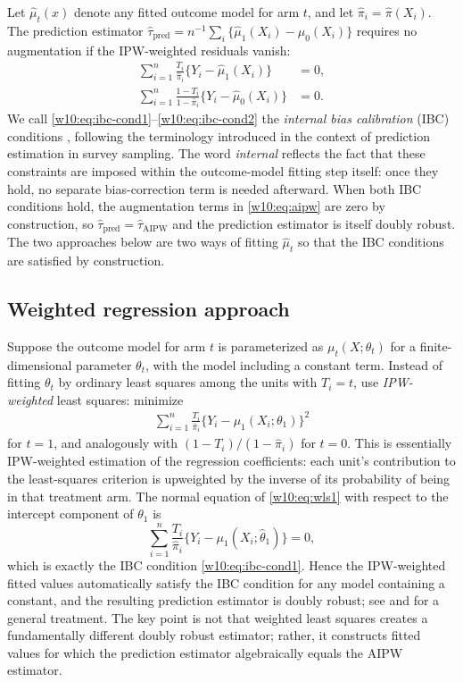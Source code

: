 \documentclass[master.tex]{subfiles}
\begin{document}
Let $\hat\mu_t(x)$ denote any fitted outcome model for arm $t$, and
let $\hat\pi_i = \hat\pi(X_i)$.  The prediction estimator
$\hat\tau_{\mathrm{pred}} = n^{-1}\sum_i\{\hat\mu_1(X_i)-\hat\mu_0(X_i)\}$
requires no augmentation if the IPW-weighted residuals vanish:
\begin{align}
  \sum_{i=1}^n \frac{T_i}{\hat\pi_i}
    \bigl\{Y_i - \hat\mu_1(X_i)\bigr\} &= 0,
  \label{w10:eq:ibc-cond1} \\
  \sum_{i=1}^n \frac{1-T_i}{1-\hat\pi_i}
    \bigl\{Y_i - \hat\mu_0(X_i)\bigr\} &= 0.
  \label{w10:eq:ibc-cond2}
\end{align}
We call \eqref{w10:eq:ibc-cond1}--\eqref{w10:eq:ibc-cond2} the
\emph{internal bias calibration} (IBC) conditions
\citep{firth1998robust}, following the terminology introduced in the
context of prediction estimation in survey sampling.  The word
\emph{internal} reflects the fact that these constraints are imposed
within the outcome-model fitting step itself: once they hold, no
separate bias-correction term is needed afterward.  When both IBC
conditions hold, the augmentation terms in \eqref{w10:eq:aipw} are
zero by construction, so $\hat\tau_{\mathrm{pred}} =
\hat\tau_{\mathrm{AIPW}}$ and the prediction estimator is itself
doubly robust.  The two approaches below are two ways of fitting
$\hat\mu_t$ so that the IBC conditions are satisfied by construction.

\subsection{Weighted regression approach}
\label{w10:subsec:wls}

Suppose the outcome model for arm $t$ is parameterized as
$\mu_t(X;\theta_t)$ for a finite-dimensional parameter $\theta_t$,
with the model including a constant term.  Instead of fitting
$\theta_t$ by ordinary least squares among the units with $T_i=t$,
use \emph{IPW-weighted} least squares: minimize
\begin{align}
  \sum_{i=1}^n \frac{T_i}{\hat\pi_i}
    \bigl\{Y_i - \mu_1(X_i;\theta_1)\bigr\}^2
  \label{w10:eq:wls1}
\end{align}
for $t=1$, and analogously with $(1-T_i)/(1-\hat\pi_i)$ for $t=0$.
This is essentially IPW-weighted estimation of the regression
coefficients: each unit's contribution to the least-squares criterion
is upweighted by the inverse of its probability of being in that
treatment arm.  The normal equation of \eqref{w10:eq:wls1} with
respect to the intercept component of $\theta_1$ is
\[
  \sum_{i=1}^n \frac{T_i}{\hat\pi_i}
    \bigl\{Y_i - \mu_1(X_i;\hat\theta_1)\bigr\} = 0,
\]
which is exactly the IBC condition \eqref{w10:eq:ibc-cond1}.  Hence
the IPW-weighted fitted values automatically satisfy the IBC
condition for any model containing a constant, and the resulting
prediction estimator is doubly robust; see \citet{robins1994estimation}
and \citet{bang2005doubly} for a general treatment.
The key point is not that weighted least squares creates a
fundamentally different doubly robust estimator; rather, it constructs
fitted values for which the prediction estimator algebraically equals
the AIPW estimator.
\end{document}
